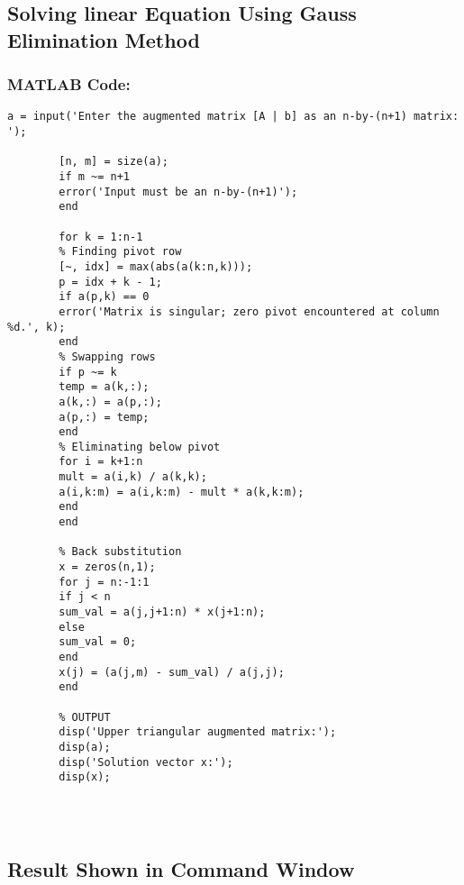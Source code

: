\documentclass[a4paper,12pt]{article}
\begin{document}
	\subsection{Solving linear Equation Using  Gauss Elimination Method}
	\subsubsection{MATLAB Code:}
	\begin{lstlisting}[style=vscode-light, caption={SSolving linear Equation Using  Gauss Elimination Method in MATLAB.} ]
		a = input('Enter the augmented matrix [A | b] as an n-by-(n+1) matrix: ');
		
		[n, m] = size(a);
		if m ~= n+1
		error('Input must be an n-by-(n+1)');
		end
		
		for k = 1:n-1
		% Finding pivot row
		[~, idx] = max(abs(a(k:n,k)));
		p = idx + k - 1;
		if a(p,k) == 0
		error('Matrix is singular; zero pivot encountered at column %d.', k);
		end
		% Swapping rows 
		if p ~= k
		temp = a(k,:);
		a(k,:) = a(p,:);
		a(p,:) = temp;
		end
		% Eliminating below pivot
		for i = k+1:n
		mult = a(i,k) / a(k,k);
		a(i,k:m) = a(i,k:m) - mult * a(k,k:m);
		end
		end
		
		% Back substitution
		x = zeros(n,1);
		for j = n:-1:1
		if j < n
		sum_val = a(j,j+1:n) * x(j+1:n);
		else
		sum_val = 0;
		end
		x(j) = (a(j,m) - sum_val) / a(j,j);
		end
		
		% OUTPUT
		disp('Upper triangular augmented matrix:');
		disp(a);
		disp('Solution vector x:');
		disp(x);
		
		
		
	\end{lstlisting}
	
	
	
	\newpage
	\subsection{Result Shown in Command Window}
	
\end{document}
